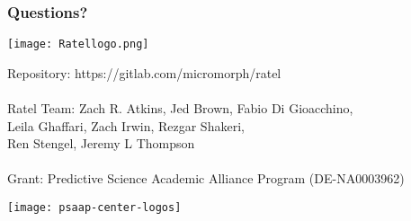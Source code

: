 \documentclass{beamer}
\begin{document}
\begin{frame}
\frametitle{Questions?}

\begin{center}
\texttt{[image: Ratellogo.png]}
\end{center}

{\flushleft

Repository: https://gitlab.com/micromorph/ratel\\

~\\

Ratel Team: Zach R. Atkins, Jed Brown, Fabio Di Gioacchino,\\
\hspace{20mm} Leila Ghaffari, Zach Irwin, Rezgar Shakeri,\\
\hspace{20mm} Ren Stengel, Jeremy L Thompson\\

~\\

Grant: Predictive Science Academic Alliance Program (DE-NA0003962)\\

}

\begin{center}
\texttt{[image: psaap-center-logos]}
\end{center}

\end{frame}

\end{document}

